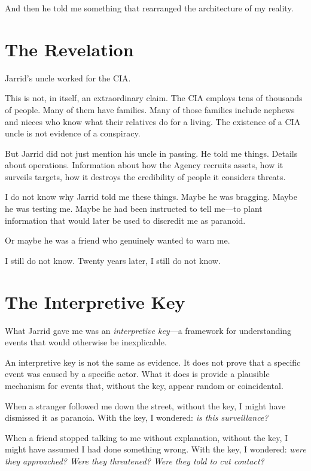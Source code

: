 \documentclass[11pt,openany]{book}
\begin{document}
And then he told me something that rearranged the architecture of my reality.

\section*{The Revelation}

Jarrid's uncle worked for the CIA.

This is not, in itself, an extraordinary claim. The CIA employs tens of thousands of people. Many of them have families. Many of those families include nephews and nieces who know what their relatives do for a living. The existence of a CIA uncle is not evidence of a conspiracy.

But Jarrid did not just mention his uncle in passing. He told me things. Details about operations. Information about how the Agency recruits assets, how it surveils targets, how it destroys the credibility of people it considers threats.

I do not know why Jarrid told me these things. Maybe he was bragging. Maybe he was testing me. Maybe he had been instructed to tell me---to plant information that would later be used to discredit me as paranoid.

Or maybe he was a friend who genuinely wanted to warn me.

I still do not know. Twenty years later, I still do not know.

\section*{The Interpretive Key}

What Jarrid gave me was an \textit{interpretive key}---a framework for understanding events that would otherwise be inexplicable.

An interpretive key is not the same as evidence. It does not prove that a specific event was caused by a specific actor. What it does is provide a plausible mechanism for events that, without the key, appear random or coincidental.

When a stranger followed me down the street, without the key, I might have dismissed it as paranoia. With the key, I wondered: \textit{is this surveillance?}

When a friend stopped talking to me without explanation, without the key, I might have assumed I had done something wrong. With the key, I wondered: \textit{were they approached? Were they threatened? Were they told to cut contact?}
\end{document}

